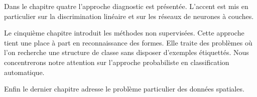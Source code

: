 Dans le chapitre quatre l'approche diagnostic est pr\'esent\'ee. 
L'accent est mis en particulier sur la discrimination lin\'eaire
et sur les r\'eseaux de neurones \`a couches.

Le cinqui\`eme chapitre introduit les m\'ethodes non supervis\'ees. Cette
approche tient une place \`a part en reconnaissance des formes. Elle
traite des probl\`emes o\`u l'on recherche une structure de classe
sans disposer d'exemples \'etiquett\'es. Nous concentrerons notre
attention sur l'approche probabiliste en classification automatique. 

Enfin le dernier chapitre adresse le  probl\`eme particulier des
donn\'ees spatiales.











